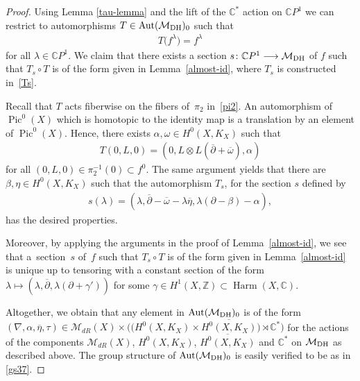 \documentclass[pdftex]{sigma}
\numberwithin{equation}{section}
\begin{document}
\begin{proof} Using Lemma \ref{tau-lemma} and the lift of the $\mathbb C^*$ action on $\mathbb C P^1$ we can restrict to automorphisms $T\in \operatorname{Aut}(\mathcal M_{\rm DH})_0$ such that
\begin{gather*}T\big(f^\lambda\big) = f^\lambda\end{gather*} for all $\lambda\in\mathbb CP^1$. We claim that there exists a section $s \colon {\mathbb C}P^1 \longrightarrow {\mathcal M}_{\rm DH}$ of $f$ such that $T_s\circ T$ is of the form given in Lemma~\ref{almost-id}, where $T_s$ is constructed in~\eqref{Ts}.

Recall that $T$ acts f\/iberwise on the f\/ibers of~$\pi_2$ in~\eqref{pi2}. An automorphism of $\operatorname{Pic}^0(X)$ which is homotopic to the identity map is a translation by an element of $\operatorname{Pic}^0(X)$. Hence, there exists $\alpha, \omega \in H^0(X, K_X)$ such that
\begin{gather*}T(0, L, 0) = (0, L\otimes L(\overline{\partial}+\overline{\omega}), \alpha)\end{gather*}
for all $(0, L, 0) \in \pi_2^{-1}(0) \subset f^0$. The same argument yields that there are $\beta, \eta \in H^0(X, K_X)$ such that the automorphism $T_s$, for the section $s$ def\/ined by
\begin{gather*}s(\lambda) = (\lambda, \overline{\partial} -\overline{\omega}-\lambda\overline{\eta}, \lambda(\partial-\beta)-\alpha) ,\end{gather*}
has the desired properties.

Moreover, by applying the arguments in the proof of Lemma~\ref{almost-id}, we see that a~section~$s$ of~$f$ such that $T_s\circ T$ is of the form given in Lemma~\ref{almost-id} is unique up to tensoring with a constant section of the form $\lambda \longmapsto (\lambda, \overline{\partial}, \lambda(\partial+\gamma'))$ for some $\gamma \in H^1(X, \mathbb Z) \subset \operatorname{Harm}(X, \mathbb C)$.

Altogether, we obtain that any element in $\operatorname{Aut}({\mathcal M}_{\rm DH})_0$ is of the form $(\nabla, \alpha, \overline{\eta}, \tau)\in\mathcal M_{dR}(X)\times \big(\big(H^0(X, K_X)\times\overline{H^0(X, K_X)}\big)\rtimes {\mathbb C}^*\big)$ for the actions of the components $\mathcal M_{dR}(X)$, $H^0(X, K_X)$, $\overline{H^0(X, K_X)}$ and ${\mathbb C}^*$ on ${\mathcal M}_{\rm DH}$ as described above. The group structure of $\operatorname{Aut}({\mathcal M}_{\rm DH})_0$ is easily verif\/ied to be as in \eqref{gs37}.
\end{proof}
\end{document}
